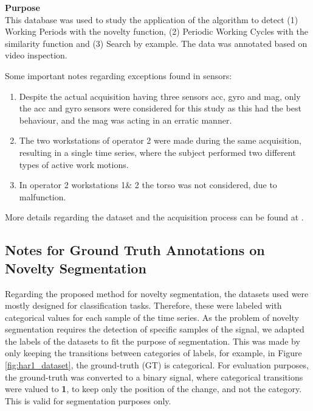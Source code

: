 \textbf{Purpose}\\
This database was used to study the application of the algorithm to detect (1) Working Periods with the novelty function, (2) Periodic Working Cycles with the similarity function and (3) Search by example. The data was annotated based on video inspection.
\par
Some important notes regarding exceptions found in sensors:
\begin{enumerate}
\item Despite the actual acquisition having three sensors \gls{acc}, \gls{gyro} and \gls{mag}, only the \gls{acc} and \gls{gyro} sensors were considered for this study as this had the best behaviour, and the \gls{mag} was acting in an erratic manner.
\item The two workstations of operator 2 were made during the same acquisition, resulting in a single time series, where the subject performed two different types of active work motions.
\item In operator 2 workstations 1\& 2 the torso was not considered, due to malfunction.
\end{enumerate}
More details regarding the dataset and the acquisition process can be found at \cite{sara2019, santos}.


\subsection{Notes for Ground Truth Annotations on Novelty Segmentation}

Regarding the proposed method for novelty segmentation, the datasets used were mostly designed for classification tasks. Therefore, these were labeled with categorical values for each sample of the time series. As the problem of novelty segmentation requires the detection of specific samples of the signal, we adapted the labels of the datasets to fit the purpose of segmentation. This was made by only keeping the transitions between categories of labels, for example, in Figure \ref{fig:har1_dataset}, the ground-truth (GT) is categorical. For evaluation purposes, the ground-truth was converted to a binary signal, where categorical transitions were valued to \textbf{1}, to keep only the position of the change, and not the category. This is valid for segmentation purposes only.